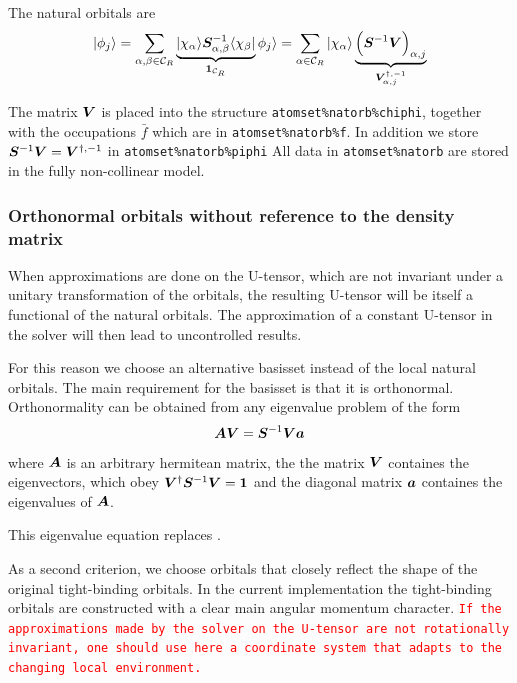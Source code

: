 \documentclass[11pt,a4paper]{report}
\newcommand{\petertt}[1]{\textcolor{red}{\texttt{#1}}}
\begin{document}
The natural orbitals are
\begin{eqnarray}
|\phi_j\rangle=\sum_{\alpha,\beta\in\mathcal{C}_R}
\underbrace{|\chi_\alpha\rangle
\bm{S}^{-1}_{\alpha,\beta}\langle\chi_\beta|}_{\bm{1}_{\mathcal{C}_R}}
\phi_j\rangle
=\sum_{\alpha\in\mathcal{C}_R}|\chi_\alpha\rangle
\underbrace{\Bigl(\bm{S}^{-1}\bm{V}\Bigr)_{\alpha,j}}_{\bm{V}^{\dagger,-1}_{\alpha,j}}
\end{eqnarray}

The matrix $\bm{V}$ is placed into the structure
\verb|atomset%natorb%chiphi|, together with the occupations $\bar{f}$
which are in \verb|atomset%natorb%f|. In addition we store
$\bm{S}^{-1}\bm{V}=\bm{V}^{\dagger,-1}$ in
\verb|atomset%natorb%piphi| All data in \verb|atomset%natorb| are
stored in the fully non-collinear model.

\subsubsection{Orthonormal orbitals without reference to the density matrix}
When approximations are done on the U-tensor, which are not invariant
under a unitary transformation of the orbitals, the resulting U-tensor
will be itself a functional of the natural orbitals. The approximation
of a constant U-tensor in the solver will then lead to uncontrolled
results.

For this reason we choose an alternative basisset instead of the local
natural orbitals. The main requirement for the basisset is that it is
orthonormal.  Orthonormality can be obtained from any eigenvalue
problem of the form
\begin{eqnarray}
\bm{A}\bm{V}=\bm{S}^{-1}\bm{V}\bm{a}
\end{eqnarray}
where $\bm{A}$ is an arbitrary hermitean matrix, the the matrix
$\bm{V}$ containes the eigenvectors, which obey
$\bm{V}^\dagger\bm{S}^{-1}\bm{V}=\bm{1}$ and the diagonal matrix
$\bm{a}$ containes the eigenvalues of $\bm{A}$.

This eigenvalue equation replaces .

As a second criterion, we choose orbitals that closely reflect the
shape of the original tight-binding orbitals. In the current
implementation the tight-binding orbitals are constructed with a clear
main angular momentum character. \petertt{If the approximations made
  by the solver on the U-tensor are not rotationally invariant, one
  should use here a coordinate system that adapts to the changing
  local environment.}
\end{document}
